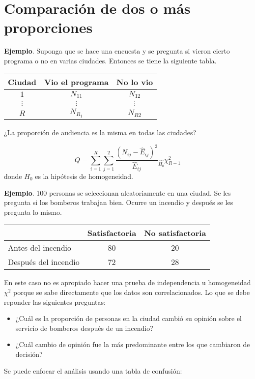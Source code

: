 \documentclass[
  12pt,
]{book}
\providecommand{\tightlist}{%
  \setlength{\itemsep}{0pt}\setlength{\parskip}{0pt}}
\begin{document}
\hypertarget{comparaciuxf3n-de-dos-o-muxe1s-proporciones}{%
\section{Comparación de dos o más proporciones}\label{comparaciuxf3n-de-dos-o-muxe1s-proporciones}}

\textbf{Ejemplo}. Suponga que se hace una encuesta y se pregunta si vieron cierto
programa o no en varias ciudades. Entonces se tiene la siguiente tabla.

\begin{longtable}[]{@{}ccc@{}}
\toprule
Ciudad & Vio el programa & No lo vio\tabularnewline
\midrule
\endhead
\(1\) & \(N_{11}\) & \(N_{12}\)\tabularnewline
\(\vdots\) & \(\vdots\) & \(\vdots\)\tabularnewline
\(R\) & \(N_{R_1}\) & \(N_{R2}\)\tabularnewline
\bottomrule
\end{longtable}

¿La proporción de audiencia es la misma en todas las ciudades?

\[Q = \sum_{i=1}^R\sum_{j=1}^2\dfrac{(N_{ij}-\hat E_{ij})^{2}}{\hat
E_{ij}}\underset{H_0}\sim \chi^2_{R-1}\] donde \(H_0\) es la hipótesis de
homogeneidad.

\textbf{Ejemplo}. 100 personas se seleccionan aleatoriamente en una ciudad. Se les
pregunta si los bomberos trabajan bien. Ocurre un incendio y después se les
pregunta lo mismo.

\begin{longtable}[]{@{}lcc@{}}
\toprule
& Satisfactoria & No satisfactoria\tabularnewline
\midrule
\endhead
Antes del incendio & 80 & 20\tabularnewline
Después del incendio & 72 & 28\tabularnewline
\bottomrule
\end{longtable}

En este caso no es apropiado hacer una prueba de independencia u homogeneidad
\(\chi ^{2}\) porque se sabe directamente que los datos son correlacionados. Lo
que se debe reponder las siguientes preguntas:

\begin{itemize}
\tightlist
\item
  ¿Cuál es la proporción de personas en la ciudad cambió su opinión sobre el
  servicio de bomberos después de un incendio?
\item
  ¿Cuál cambio de opinión fue la más predominante entre los que cambiaron de
  decisión?
\end{itemize}

Se puede enfocar el análisis usando una tabla de confusión:
\end{document}

